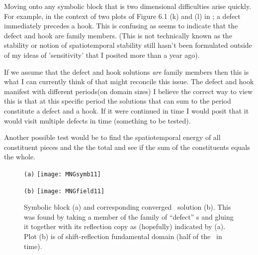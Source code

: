 \begin{description}
{Moving onto any symbolic block that is two dimensional difficulties arise
quickly. For example, in the context of two plots of Figure 6.1 (k) and (l) in ;
a defect immediately precedes a hook. This is confusing as 
seems to indicate
that the defect and hook are family members.
(This is not technically known as the stability
or notion of spatiotemporal stability still hasn't been formulated outside of my ideas
of 'sensitivity' that I posited more than a year ago).

If we assume that the defect and hook solutions \emph{are} family members then this is what
I can currently think of that might reconcile this issue.
The defect and hook manifest with different periods(on domain sizes) I believe
the correct way to view this is that at this specific period the solutions that can sum to the period
constitute a defect and a hook. If it were continued in time I would posit that it would visit
multiple defects in time (something to be tested).

Another possible test would be to find the spatiotemporal energy of all constituent pieces and the
the total and see if the sum of the constituents equals the whole.
}

\begin{figure}
\centering
\begin{minipage}[height=.32\textheight]{.48\textwidth}
\centering \small{\texttt{(a)}}
\texttt{[image: MNGsymb11]}
\end{minipage}
\begin{minipage}[height=.32\textheight]{.48\textwidth}
\centering \small{\texttt{(b)}}
\texttt{[image: MNGfield11]}
\end{minipage}
\caption{ \label{fig:MNGsymb11}
Symbolic block (a) and corresponding converged \spt\ solution (b). This was found by taking
a member of the family of ``defect'' \rpo s and gluing it together with
its reflection copy as (hopefully) indicated by (a).
Plot (b) is of shift-reflection fundamental domain (half of the \twot\ in time).
}
\end{figure}

\end{description}
